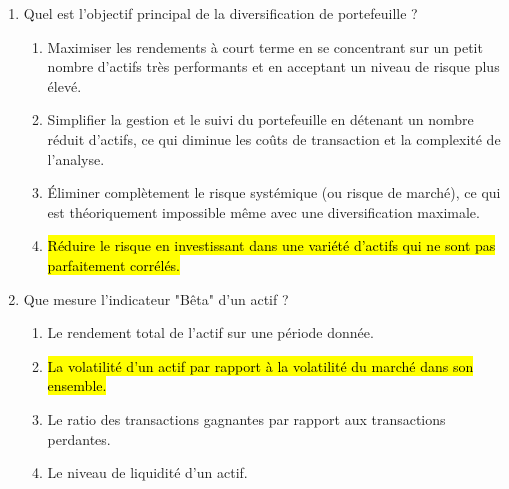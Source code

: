 \documentclass[a4paper,12pt]{article}
\begin{document}
\begin{enumerate}
    \item Quel est l'objectif principal de la diversification de portefeuille ?
    \begin{enumerate}[label=(\Alph*)]
        \item Maximiser les rendements à court terme en se concentrant sur un petit nombre d'actifs très performants et en acceptant un niveau de risque plus élevé.
        \item Simplifier la gestion et le suivi du portefeuille en détenant un nombre réduit d'actifs, ce qui diminue les coûts de transaction et la complexité de l'analyse.
        \item Éliminer complètement le risque systémique (ou risque de marché), ce qui est théoriquement impossible même avec une diversification maximale.
        \item \hl{Réduire le risque en investissant dans une variété d'actifs qui ne sont pas parfaitement corrélés.}
    \end{enumerate}

    \item Que mesure l'indicateur "Bêta" d'un actif ?
    \begin{enumerate}[label=(\Alph*)]
        \item Le rendement total de l'actif sur une période donnée.
        \item \hl{La volatilité d'un actif par rapport à la volatilité du marché dans son ensemble.}
        \item Le ratio des transactions gagnantes par rapport aux transactions perdantes.
        \item Le niveau de liquidité d'un actif.
    \end{enumerate}
    

\end{enumerate}
\end{document}
